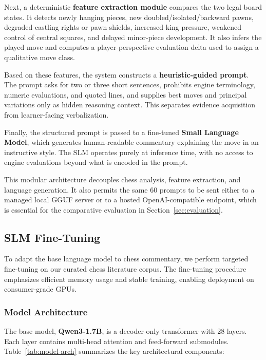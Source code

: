 \documentclass[sigconf,nonacm]{acmart}
\begin{document}
Next, a deterministic \textbf{feature extraction module} compares the two legal board states. It detects newly hanging pieces, new doubled/isolated/backward pawns, degraded castling rights or pawn shields, increased king pressure, weakened control of central squares, and delayed minor-piece development. It also infers the played move and computes a player-perspective evaluation delta used to assign a qualitative move class.

Based on these features, the system constructs a \textbf{heuristic-guided prompt}. The prompt asks for two or three short sentences, prohibits engine terminology, numeric evaluations, and quoted lines, and supplies best moves and principal variations only as hidden reasoning context. This separates evidence acquisition from learner-facing verbalization.

Finally, the structured prompt is passed to a fine-tuned \textbf{Small Language Model}, which generates human-readable commentary explaining the move in an instructive style. The SLM operates purely at inference time, with no access to engine evaluations beyond what is encoded in the prompt.

This modular architecture decouples chess analysis, feature extraction, and language generation. It also permits the same 60 prompts to be sent either to a managed local GGUF server or to a hosted OpenAI-compatible endpoint, which is essential for the comparative evaluation in Section~\ref{sec:evaluation}.


\subsection{SLM Fine-Tuning}

To adapt the base language model to chess commentary, we perform targeted fine-tuning on our curated chess literature corpus. The fine-tuning procedure emphasizes efficient memory usage and stable training, enabling deployment on consumer-grade GPUs.

\subsubsection{Model Architecture}

The base model, \textbf{Qwen3-1.7B}, is a decoder-only transformer with 28 layers. Each layer contains multi-head attention and feed-forward submodules. Table~\ref{tab:model-arch} summarizes the key architectural components:
\end{document}
